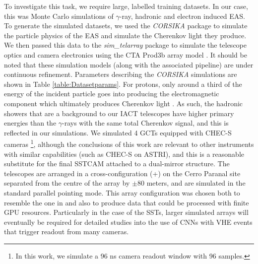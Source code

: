 To investigate this task, we require large, labelled training datasets. In our case, this was Monte Carlo simulations of $\gamma$-ray, hadronic and electron induced EAS. To generate the simulated datasets, we used the \textit{CORSIKA} package \cite{corsika} to simulate the particle physics of the EAS and simulate the Cherenkov light they produce. We then passed this data to the \textit{sim\_telarray} package \cite{BERNLOHR} to simulate the telescope optics and camera electronics using the CTA Prod3b array model \cite{prod3b}. It should be noted that these simulation models (along with the associated pipeline) are under continuous refinement. Parameters describing the \textit{CORSIKA} simulations are shown in Table \ref{table:Datasetparams}. For protons, only around a third of the energy of the incident particle goes into producing the electromagnetic component which ultimately produces Cherenkov light \cite{tomthesis}. As such, the hadronic showers that are a background to our IACT telescopes have higher primary energies than the $\gamma$-rays with the same total Cherenkov signal, and this is reflected in our simulations. We simulated 4 GCTs \cite{gct} equipped with CHEC-S cameras \footnote{In this work, we simulate a 96 ns camera readout window with 96 samples.}, although the conclusions of this work are relevant to other instruments with similar capabilities (such as CHEC-S on ASTRI), and this is a reasonable substitute for the final SSTCAM attached to a dual-mirror structure. The telescopes are arranged in a cross-configuration (+) on the Cerro Paranal site separated from the centre of the array by $\pm$80 meters, and are simulated in the standard parallel pointing mode. This array configuration was chosen both to resemble the one in \cite{Shilon} and also to produce data that could be processed with finite GPU resources. Particularly in the case of the SSTs, larger simulated arrays will eventually be required for detailed studies into the use of CNNs with VHE events that trigger readout from many cameras.

